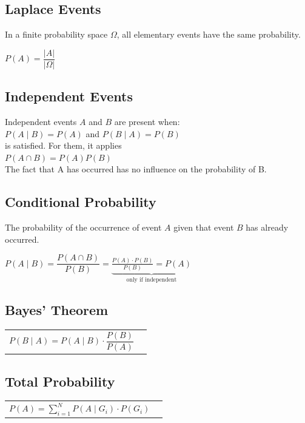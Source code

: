 	\subsection{Laplace Events}
		In a finite probability space $\Omega$, all
		elementary events have the same probability.
		\begin{center}
		$P(A)=\dfrac{\left| A\right|}{\left|\Omega\right|}$
		\end{center}

	\subsection{Independent Events}
		Independent events $A$ and $B$ are present when:\\
		\hspace*{8mm} $P(A\mid B)=P(A)$ \hspace{4mm} and \hspace{4mm}
		$P(B\mid A)=P(B)$\\
		is satisfied. For them, it applies\\
		\hspace*{8mm} $P(A\cap B)=P(A)P(B)$\\
		The fact that A has occurred has no influence on the
		probability of B.\vspace{1mm}


	\subsection{Conditional Probability}
		The probability of the occurrence of event $A$ given that
		event $B$ has already occurred.
		\begin{center}
		$P(A\mid B)= \dfrac{P(A\cap B)}{P(B)}=\underbrace{\frac{P(A)\cdot
		P(B)}{P(B)}=P(A)}_{\text{only if independent}}$
		\end{center}


	\subsection{Bayes' Theorem}
		\begin{tabular}{ll}
		$P(B\mid A)=P(A\mid B) \cdot\dfrac{P(B)}{P(A)}$\vspace{1mm}
		\end{tabular}


	\subsection{Total Probability}
		\begin{tabular}{ll}
		$P(A)=\sum\limits_{i=1}^N P(A\mid G_i)\cdot P(G_i)$
		\end{tabular}


